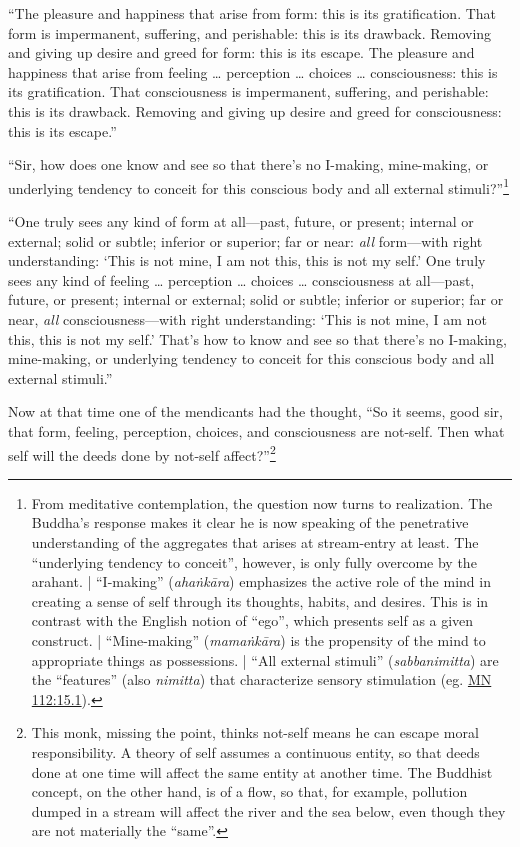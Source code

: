 \documentclass[12pt,openany]{book}%
\begin{document}
“The pleasure and happiness that arise from form: this is its gratification. That form is impermanent, suffering, and perishable: this is its drawback. Removing and giving up desire and greed for form: this is its escape. The pleasure and happiness that arise from feeling … perception … choices … consciousness: this is its gratification. That consciousness is impermanent, suffering, and perishable: this is its drawback. Removing and giving up desire and greed for consciousness: this is its escape.” 

“Sir, how does one know and see so that there’s no I-making, mine-making, or underlying tendency to conceit for this conscious body and all external stimuli?”\footnote{From meditative contemplation, the question now turns to realization. The Buddha’s response makes it clear he is now speaking of the penetrative understanding of the aggregates that arises at stream-entry at least. The “underlying tendency to conceit”, however, is only fully overcome by the arahant. | “I-making” (\textit{\textsanskrit{ahaṅkāra}}) emphasizes the active role of the mind in creating a sense of self through its thoughts, habits, and desires. This is in contrast with the English notion of “ego”, which presents self as a given construct. | “Mine-making” (\textit{\textsanskrit{mamaṅkāra}}) is the propensity of the mind to appropriate things as possessions. | “All external stimuli” (\textit{sabbanimitta}) are the “features” (also \textit{nimitta}) that characterize sensory stimulation (eg. \href{https://suttacentral.net/mn112/en/sujato\#15.1}{MN 112:15.1}). } 

“One truly sees any kind of form at all—past, future, or present; internal or external; solid or subtle; inferior or superior; far or near: \emph{all} form—with right understanding: ‘This is not mine, I am not this, this is not my self.’ One truly sees any kind of feeling … perception … choices … consciousness at all—past, future, or present; internal or external; solid or subtle; inferior or superior; far or near, \emph{all} consciousness—with right understanding: ‘This is not mine, I am not this, this is not my self.’ That’s how to know and see so that there’s no I-making, mine-making, or underlying tendency to conceit for this conscious body and all external stimuli.” 

Now at that time one of the mendicants had the thought, “So it seems, good sir, that form, feeling, perception, choices, and consciousness are not-self. Then what self will the deeds done by not-self affect?”\footnote{This monk, missing the point, thinks not-self means he can escape moral responsibility. A theory of self assumes a continuous entity, so that deeds done at one time will affect the same entity at another time. The Buddhist concept, on the other hand, is of a flow, so that, for example, pollution dumped in a stream will affect the river and the sea below, even though they are not materially the “same”. } 
\end{document}
